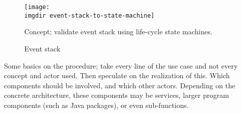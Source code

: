 





\begin{figure}[ht]
\centering
\texttt{[image: \\imgdir event-stack-to-state-machine]}
\caption{Concept; validate event stack using life-cycle state machines.}
\label{fig:event-stack-to-state-machine}
\end{figure}

\begin{figure}[ht]
\centering
\begin{drawstack}
\end{drawstack}
\caption{Event stack}
\label{fig:event-stack-example}
\end{figure}

Some basics on the procedure; take every line of the use case and not every concept and actor used. Then speculate on the realization of this. Which components should be involved, and which other actors. Depending on the concrete architecture, these components may be services, larger program components (such as Java packages), or even sub-functions.




